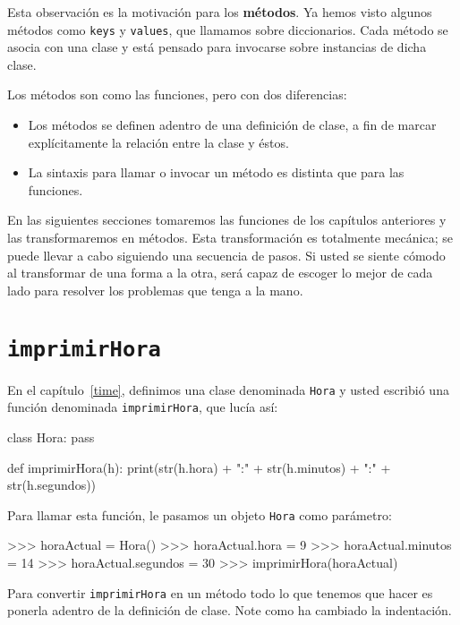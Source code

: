 Esta observación es la motivación para los \textbf{métodos}. Ya hemos
visto algunos métodos como \texttt{keys} y \texttt{values}, que llamamos
sobre diccionarios. Cada método se asocia con una clase y está pensado
para invocarse sobre instancias de dicha clase.

   

Los métodos son como las funciones, pero con dos diferencias:
\begin{itemize}
\item Los métodos se definen adentro de una definición de clase, a fin de
marcar explícitamente la relación entre la clase y éstos.
\item La sintaxis para llamar o invocar un método es distinta que para las
funciones.
\end{itemize}
En las siguientes secciones tomaremos las funciones de los capítulos
anteriores y las transformaremos en métodos. Esta transformación es
totalmente mecánica; se puede llevar a cabo siguiendo una secuencia
de pasos. Si usted se siente cómodo al transformar de una forma a
la otra, será capaz de escoger lo mejor de cada lado para resolver
los problemas que tenga a la mano.

\section{\texttt{imprimirHora}}

\label{printTime} 

En el capítulo~\ref{time}, definimos una clase denominada \texttt{Hora}
y usted escribió una función denominada \texttt{imprimirHora}, que
lucía así:
\begin{pythoncode}
class Hora:
  pass

def imprimirHora(h):
  print(str(h.hora) + ":" + 
        str(h.minutos) + ":" + 
        str(h.segundos))
\end{pythoncode}

Para llamar esta función, le pasamos un objeto \texttt{Hora} como
parámetro:
\begin{pyconcode}
>>> horaActual = Hora()
>>> horaActual.hora = 9
>>> horaActual.minutos = 14
>>> horaActual.segundos = 30
>>> imprimirHora(horaActual)
\end{pyconcode}

Para convertir \texttt{imprimirHora} en un método todo lo que tenemos
que hacer es ponerla adentro de la definición de clase. Note como
ha cambiado la indentación.

